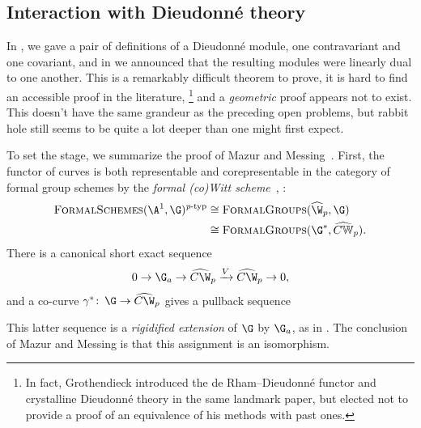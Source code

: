 \subsection*{Interaction with Dieudonn\'e theory}

In , we gave a pair of definitions of a Dieudonn\'e module, one contravariant and one covariant, and in  we announced that the resulting modules were linearly dual to one another.
This is a remarkably difficult theorem to prove, it is hard to find an accessible proof in the literature,%
\footnote{%
In fact, Grothendieck introduced the de Rham--Dieudonn\'e functor and crystalline Dieudonn\'e theory in the same landmark paper, but elected not to provide a proof of an equivalence of his methods with past ones.
}
and a \emph{geometric} proof appears not to exist.
This doesn't have the same grandeur as the preceding open problems, but rabbit hole still seems to be quite a lot deeper than one might first expect.

To set the stage, we summarize the proof of Mazur and Messing~\cite[Section II.15]{MazurMessing}.
First, the functor of curves is both representable and corepresentable in the category of formal group schemes by the \textit{formal (co)Witt scheme}~\cite[Chapter 3]{ZinkCartierTheory}, \cite[Section III.4]{LazardCFGs}:
\begin{align*}
\CatOf{FormalSchemes}(\A^1, \G)^{\ptyp} & \cong \CatOf{FormalGroups}(\widehat{\W}_p, \G) \\
& \cong \CatOf{FormalGroups}(\G^*, \widehat{C\mathbb W}_p).
\end{align*}
There is a canonical short exact sequence \[0 \to \G_a \to \widehat{C\W}_p \xrightarrow{V} \widehat{C\W}_p \to 0,\] and a co-curve \(\gamma^*\co \G \to \widehat{C\W}_p\) gives a pullback sequence
\begin{center}
\end{center}
This latter sequence is a \textit{rigidified extension} of \(\G\) by \(\G_a\), as in .
The conclusion of Mazur and Messing is that this assignment is an isomorphism.

